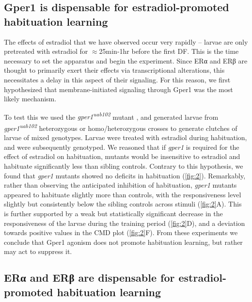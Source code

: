 \documentclass[9.5pt,lineno]{RandlettLab_elife}
\begin{document}
{\subsection{Gper1 is dispensable for estradiol-promoted habituation learning}


The effects of estradiol that we have observed occur very rapidly -- larvae are only pretreated with estradiol for $\approx$25min-1hr before the first DF. 
This is the time necessary to set the apparatus and begin the experiment.
Since ERα and ERβ are thought to primarily exert their effects via transcriptional alterations, this necessitates a delay in this aspect of their signaling.
For this reason, we first hypothesized that membrane-initiated signaling through Gper1 was the most likely mechanism. 

To test this we used the \emph{gper1\textsuperscript{uab102}} mutant \citep{Romano2017-ep}, and generated larvae from \emph{gper1\textsuperscript{uab102}} heterozygous or homo/heterozygous crosses to generate clutches of larvae of mixed genotypes. 
Larvae were treated with estradiol during habituation, and were subsequently genotyped. 
We reasoned that if \emph{gper1} is required for the effect of estradiol on habituation, mutants would be insensitive to estradiol and habituate significantly less than sibling controls. 
Contrary to this hypothesis, we found that \emph{gper1} mutants showed no deficits in habituation (\autoref{fig:2}). 
Remarkably, rather than observing the anticipated inhibition of habituation, \emph{gper1} mutants appeared to habituate slightly more than controls, with the responsiveness level slightly but consistently below the sibling controls across stimuli (\autoref{fig:2}A). 
This is further supported by a weak but statistically significant decrease in the responsiveness of the larvae during the training period (\autoref{fig:2}D), and a deviation towards positive values in the CMD plot (\autoref{fig:2}F). 
From these experiments we conclude that Gper1 agonism does not promote habituation learning, but rather may act to suppress it.  


\subsection{ERα and ERβ are dispensable for estradiol-promoted habituation learning}


}
\end{document}
